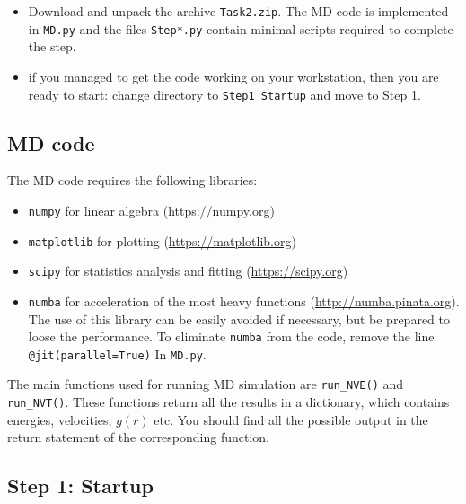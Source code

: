 \documentclass[12pt]{article}
\begin{document}
\begin{itemize}
\item Download and unpack the archive \verb!Task2.zip!. The MD code is
implemented in \verb!MD.py! and the files \verb!Step*.py! contain minimal scripts
required to complete the step.


\item  if you managed to get the code working on your workstation, then you are
ready to start: change directory to \verb!Step1_Startup! and move to Step 1.
\end{itemize}

\subsection*{MD code}
The MD code requires the following libraries: 
\begin{itemize}
\item \verb!numpy! for linear algebra (\href{https://numpy.org}{https://numpy.org})
\item	\verb!matplotlib! for plotting (\href{https://matplotlib.org}{https://matplotlib.org})
\item	\verb!scipy! for statistics analysis and fitting (\href{https://scipy.org}{https://scipy.org})
\item	\verb!numba! for acceleration of the most heavy functions
(\href{http://numba.pydata.org}{http://numba.pinata.org}). The use of 
this library can be easily avoided if necessary, but be prepared to loose the performance.
To eliminate \verb!numba! from the code, remove the line
\verb!@jit(parallel=True)! In \verb!MD.py!.
\end{itemize}

The main functions used for running MD simulation are \verb!run_NVE()! and
\verb!run_NVT()!. These functions return all the results in a dictionary, which
contains energies, velocities, $g(r)$ etc. You should find all the possible
output in the return statement of the corresponding function.



\subsection*{Step 1: Startup}
\end{document}
